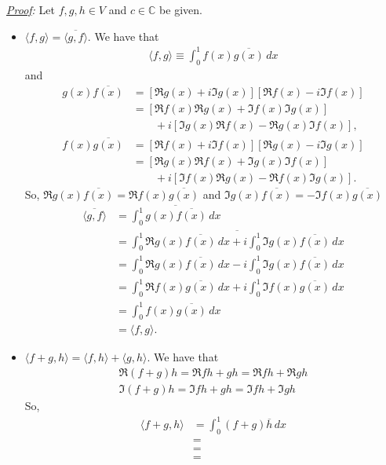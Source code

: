 \documentclass[11pt]{article}
\begin{document}
\begin{enumerate}[(a)]
	
	\noindent \textit{\underline{Proof}:} Let $f,g,h\in V$ and $c\in \mathbb{C}$ be given.
	\begin{itemize}
		\item $\boxed{\langle f,g \rangle = \overline{\langle g,f\rangle}}$. We have that
		\begin{align*}
		\langle f,g \rangle \equiv \int^1_0 f(x)\overline{g(x)}\,dx
		\end{align*}
		and
		\begin{align*}
		g(x)\overline{f(x)} &= \left[\Re{g(x)} + i\Im{g(x)}\right]\left[\Re{f(x)} - i\Im{f(x)}\right]\\
		&= \left[\Re{f(x)}\Re{g(x)} + \Im{f(x)}\Im{g(x)}\right] \\
		&\qquad + i\left[\Im{g(x)}\Re{f(x)} - \Re{g(x)}\Im{f(x)}\right],
		\end{align*}
		\begin{align*}
		f(x)\overline{g(x)} &= \left[\Re{f(x)} + i\Im{f(x)}\right]\left[\Re{g(x)} - i\Im{g(x)}\right]\\
		&= \left[\Re{g(x)}\Re{f(x)} + \Im{g(x)}\Im{f(x)}\right] \\
		&\qquad + i\left[\Im{f(x)}\Re{g(x)} - \Re{f(x)}\Im{g(x)}\right].
		\end{align*}
		So, $\Re{g(x)\overline{f(x)}} = \Re{f(x)\overline{g(x)}}$ and $\Im{g(x)\overline{f(x)}} = -\Im{f(x)\overline{g(x)}}$
		\begin{align*}
		\overline{\langle g,f \rangle} &= \overline{\int^1_0 g(x)\overline{f(x)}\,dx}\\
		&= \overline{\int^1_0 \Re{g(x)\overline{f(x)}}\,dx + i\int^1_0 \Im{g(x)\overline{f(x)}}\,dx}\\
		&= \int^1_0 \Re{g(x)\overline{f(x)}}\,dx - i\int^1_0 \Im{g(x)\overline{f(x)}}\,dx\\
		&= \int^1_0 \Re{f(x)\overline{g(x)}}\,dx + i\int^1_0 \Im{f(x)\overline{g(x)}}\,dx\\
		&= \int^1_0 f(x)\overline{g(x)}\,dx \\
		&= \langle f,g\rangle.
		\end{align*}
		
		
		
		
		
		\item $\boxed{\langle f+g ,h \rangle  = \langle f,h \rangle + \langle g,h\rangle}$. We have that 
		\begin{align*}
		\Re{(f+g)h} = \Re{fh + gh} =\Re{fh} + \Re{gh}\\
		\Im{(f+g)h} = \Im{fh + gh} =\Im{fh} + \Im{gh}
		\end{align*}
		So,
		\begin{align*}
		\langle f+g,h\rangle &= \int^1_0 (f+g)\overline{h}\,dx \\
		&= \\
		&= \\
		&= 
		\end{align*}
		

\end{itemize}
\end{enumerate}
\end{document}
